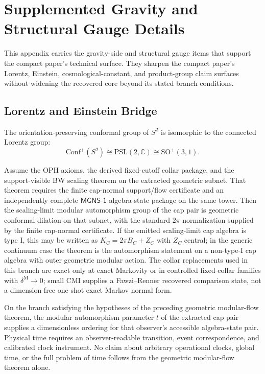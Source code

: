 \section{Supplemented Gravity and Structural Gauge Details}
\label{app:compact-technical-port}

This appendix carries the gravity-side and structural gauge items that support the compact paper's
technical surface. They sharpen the compact paper's Lorentz,
Einstein, cosmological-constant, and product-group claim surfaces without widening the recovered
core beyond its stated branch conditions.

\subsection{Lorentz and Einstein Bridge}

\begin{theorem}
The orientation-preserving conformal group of \(S^2\) is isomorphic to the connected Lorentz
group:
\[
\mathrm{Conf}^+(S^2)\cong \mathrm{PSL}(2,\mathbb C)\cong \mathrm{SO}^+(3,1).
\]
\end{theorem}

\begin{theorem}
Assume the OPH axioms, the derived fixed-cutoff collar package, and the support-visible BW
scaling theorem on the extracted geometric subnet. That theorem requires the finite cap-normal
support/flow certificate and an independently complete \(\mathsf{MGNS\text{-}1}\) algebra-state
package on the same tower. Then the scaling-limit modular
automorphism group of the cap pair is geometric conformal dilation on that
subnet, with the standard \(2\pi\) normalization supplied by the finite cap-normal certificate.
If the emitted scaling-limit cap algebra is type I, this may be written as
\(K_C=2\pi B_C+Z_C\) with \(Z_C\) central; in the generic continuum case the theorem is the
automorphism statement on a non-type-I cap algebra with outer geometric modular action. The collar
replacements used in this branch are exact only at exact Markovity or in
controlled fixed-collar families with \(\delta^{\mathrm M}\to0\); small CMI supplies a
Fawzi--Renner recovered comparison state, not a dimension-free one-shot exact Markov normal form.
\end{theorem}

\begin{definition}
On the branch satisfying the hypotheses of the preceding geometric modular-flow theorem, the
modular automorphism parameter \(t\) of the extracted cap pair supplies a dimensionless ordering for
that observer's accessible algebra-state pair. Physical time requires an observer-readable
transition, event correspondence, and calibrated clock instrument. No claim about arbitrary
operational clocks, global time, or the full problem of time follows from the geometric modular-flow
theorem alone.
\end{definition}

